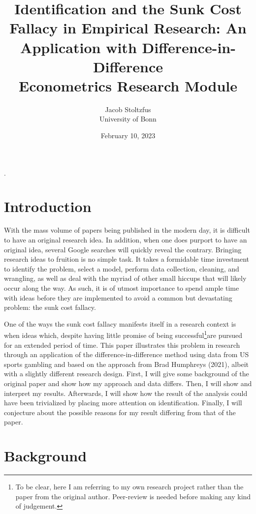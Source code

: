 \documentclass{article}
\title{Identification and the Sunk Cost Fallacy in Empirical Research: An Application with Difference-in-Difference\\\Large{Econometrics Research Module}}
\author{Jacob Stoltzfus \\ University of Bonn}
\date{February 10, 2023}
\begin{document}
\setlength{\headheight}{22.50113pt}.
\maketitle
\thispagestyle{fancy}
\clearpage
\tableofcontents
\thispagestyle{fancy}

\clearpage
\fancyfoot[C]{\thepage}

\section*{Introduction}
    With the mass volume of papers being published in the modern day, it is difficult to have an original research idea. In addition, when one does purport to have an original idea, several Google searches will quickly reveal the contrary. Bringing research ideas to fruition is no simple task. It takes a formidable time investment to identify the problem, select a model, perform data collection, cleaning, and wrangling, as well as deal with the myriad of other small hiccups that will likely occur along the way. As such, it is of utmost importance to spend ample time with ideas before they are implemented to avoid a common but devastating problem: the sunk cost fallacy.

    One of the ways the sunk cost fallacy manifests itself in a research context is when ideas which, despite having little promise of being successful\footnote{To be clear, here I am referring to my own research project rather than the paper from the original author. Peer-review is needed before making any kind of judgement.}are pursued for an extended period of time. This paper illustrates this problem in research through an application of the difference-in-difference method using data from US sports gambling and based on the approach from Brad Humphreys (2021\cite{Humphreys2021}), albeit with a slightly different research design. First, I will give some background of the original paper and show how my approach and data differs. Then, I will show and interpret my results. Afterwards, I will show how the result of the analysis could have been trivialized by placing more attention on identification. Finally, I will conjecture about the possible reasons for my result differing from that of the paper.


\section*{Background}
\end{document}
